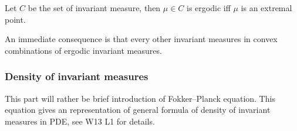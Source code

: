 \begin{thm}
Let $C$ be the set of invariant measure, then $\mu \in C$ is ergodic iff $\mu$ is an extremal point.
\end{thm}
An immediate consequence is that every other invariant measures in convex combinations of ergodic invariant measures.

\subsubsection{Density of invariant measures}
This part will rather be brief introduction of Fokker–Planck equation. This equation gives an representation of general formula of density of invariant measures in PDE, see W13 L1 for details.